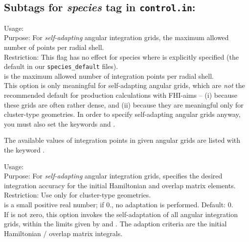\subsection*{Subtags for \emph{species} tag in \texttt{control.in}:}

{
  \noindent
  Usage:   \\[1.0ex]
  Purpose: For \emph{self-adapting} angular integration grids, the
    maximum allowed number of points per radial shell. \\[1.0ex]
  Restriction: This flag has no effect for species where
     is explicitly specified (the default in
    our \texttt{species\_default} files). \\[1.0ex]
   is the maximum allowed number of integration points
    per radial shell. \\
}
This option is only meaningful for self-adapting angular grids, which
are \emph{not} the recommended default for production calculations
with FHI-aims -- (i) because these grids are often rather dense, and
(ii) because they are meaningful only for cluster-type geometries. In 
order to specify self-adapting angular grids anyway, you must also set
the keywords  and
.  

The available values of integration points in given angular grids are
listed with the keyword . 

{
  \noindent 
  Usage:  
    \\[1.0ex]
  Purpose: For \emph{self-adapting} angular integration grids,
    specifies the desired integration accuracy for the initial 
    Hamiltonian and overlap matrix elements. \\[1.0ex]
  Restriction: Use only for cluster-type geometries. \\[1.0ex]
   is a small positive real number; if 0., no
    adaptation is performed. Default: 0. \\
}
If  is not zero, this option invokes the
self-adaptation of all angular integration grids, within the limits
given by  and
. The adaption criteria are the initial 
Hamiltonian / overlap matrix integrals. 

